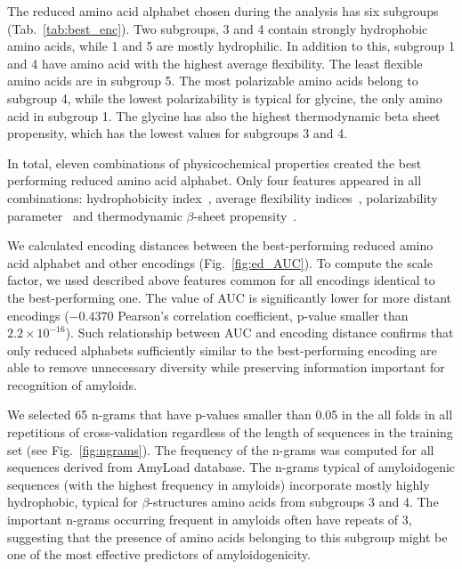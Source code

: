 \documentclass[a4,center,fleqn]{NAR}
\begin{document}
%
%
The reduced amino acid alphabet chosen during the analysis has six subgroups 
(Tab.~\ref{tab:best_enc}). Two subgroups, 3 and 4 contain strongly hydrophobic 
amino acids, while 1 and 5 are mostly hydrophilic. In addition to this, subgroup 
1 and 4 have amino acid with the highest average flexibility. The least flexible 
amino acids are in subgroup 5. The most polarizable amino acids belong to 
subgroup 4, while the lowest polarizability is typical for glycine, the only 
amino acid in subgroup 1. The glycine has also the highest thermodynamic beta 
sheet propensity, which has the lowest values for subgroups 3 and 4.

  In total, eleven combinations of physicochemical properties created the best 
performing reduced amino acid alphabet. Only four features appeared in all 
combinations: hydrophobicity index~\citep{argos_structural_1982}, average 
flexibility indices~\citep{bhaskaran_positional_1988}, polarizability 
parameter~\citep{charton_structural_1982} and thermodynamic $\beta$-sheet 
propensity~\citep{kim_thermodynamic_1993}.

  We calculated encoding distances between the best-performing reduced amino 
acid alphabet and other encodings (Fig.~\ref{fig:ed_AUC}). To compute the scale 
factor, we used described above features common for all encodings identical to 
the best-performing one. The value of AUC is significantly lower for more 
%
%
%
%
%
distant encodings ($-0.4370$ Pearson's correlation coefficient, p-value smaller 
than $2.2 \times 10^{-16}$). Such relationship between AUC and encoding distance 
confirms that only reduced alphabets sufficiently similar to the best-performing 
encoding are able to remove unnecessary diversity while preserving information 
important for recognition of amyloids.

  We selected 65 n-grams that have p-values smaller than 0.05 in the all folds 
in all repetitions of cross-validation regardless of the length of sequences in 
the training set (see Fig.~\ref{fig:ngrams}). The frequency of the n-grams was 
computed for all sequences derived from AmyLoad database. The n-grams typical of 
amyloidogenic sequences (with the highest frequency in amyloids) incorporate 
mostly highly hydrophobic, typical for $\beta$-structures amino acids from 
subgroups 3 and 4. The important n-grams occurring frequent in amyloids often 
have repeats of 3, suggesting that the presence of amino acids belonging to this 
subgroup might be one of the most effective predictors of amyloidogenicity.
\end{document}

